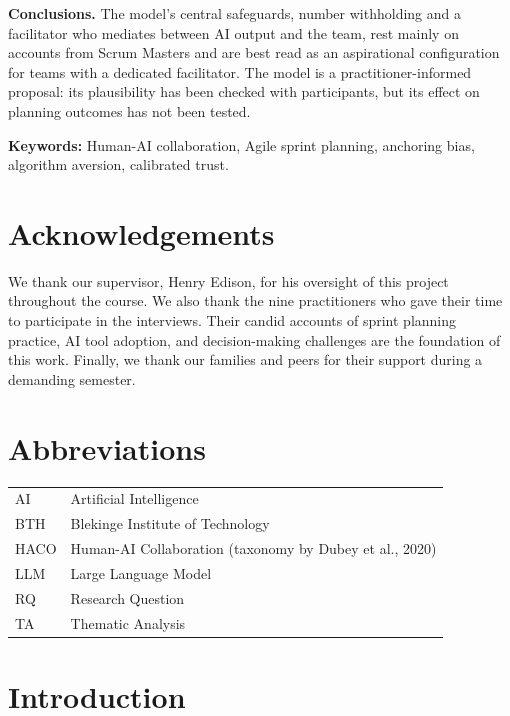 \documentclass[a4paper,twoside]{bth}
\begin{document}
\noindent
\textbf{Conclusions.}
The model's central safeguards, number withholding and a facilitator who mediates between AI output and the team, rest mainly on accounts from Scrum Masters and are best read as an aspirational configuration for teams with a dedicated facilitator. The model is a practitioner-informed proposal: its plausibility has been checked with participants, but its effect on planning outcomes has not been tested.

\vspace{1cm}
\noindent
\textbf{Keywords:} Human-AI collaboration, Agile sprint planning, anchoring bias, algorithm aversion, calibrated trust.
\clearpage

\chapter*{Acknowledgements}
We thank our supervisor, Henry Edison, for his oversight of this project throughout the course.
We also thank the nine practitioners who gave their time to participate in the interviews. Their candid accounts of sprint planning practice, AI tool adoption, and decision-making challenges are the foundation of this work.
Finally, we thank our families and peers for their support during a demanding semester.
\clearpage

\chapter*{Abbreviations}
\begin{tabular}{ll}
AI   & Artificial Intelligence \\
BTH  & Blekinge Institute of Technology \\
HACO & Human-AI Collaboration (taxonomy by Dubey et al., 2020) \\
LLM  & Large Language Model \\
RQ   & Research Question \\
TA   & Thematic Analysis \\
\end{tabular}
\clearpage

\tableofcontents
\clearpage
\listoffigures
\clearpage
\listoftables
\clearpage
{}

\chapter{Introduction}
\label{chp:introduction}
\end{document}
